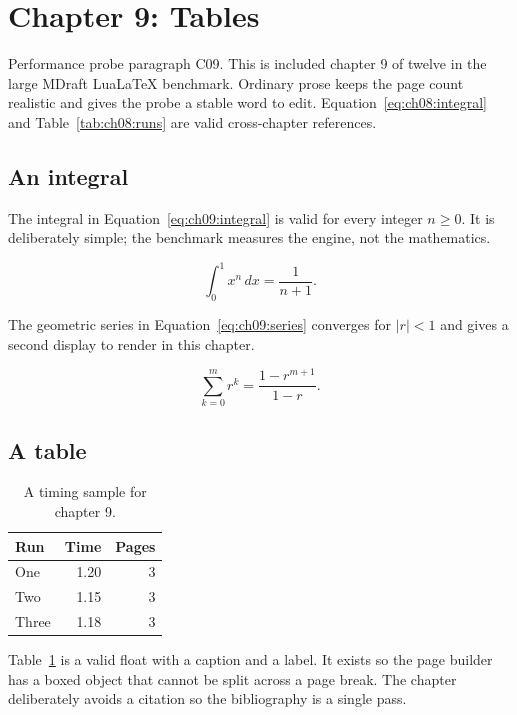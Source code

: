 \section{Chapter 9: Tables}
\label{sec:ch09}

Performance probe paragraph C09. This is included chapter 9 of twelve in
the large MDraft LuaLaTeX benchmark. Ordinary prose keeps the page count
realistic and gives the probe a stable word to edit. Equation~\ref{eq:ch08:integral} and
Table~\ref{tab:ch08:runs} are valid cross-chapter references.

\subsection{An integral}
The integral in Equation~\ref{eq:ch09:integral} is valid for every integer
$n \ge 0$. It is deliberately simple; the benchmark measures the engine, not
the mathematics.

\begin{equation}
  \label{eq:ch09:integral}
  \int_{0}^{1} x^{n}\,dx = \frac{1}{n+1}.
\end{equation}

The geometric series in Equation~\ref{eq:ch09:series} converges for
$|r| < 1$ and gives a second display to render in this chapter.

\begin{equation}
  \label{eq:ch09:series}
  \sum_{k=0}^{m} r^{k} = \frac{1-r^{m+1}}{1-r}.
\end{equation}

\subsection{A table}
\begin{table}[h]
  \centering
  \begin{tabular}{lrr}
    \toprule
    Run & Time & Pages \\
    \midrule
    One   & 1.20 & 3 \\
    Two   & 1.15 & 3 \\
    Three & 1.18 & 3 \\
    \bottomrule
  \end{tabular}
  \caption{A timing sample for chapter 9.}
  \label{tab:ch09:runs}
\end{table}

Table~\ref{tab:ch09:runs} is a valid float with a caption and a label. It
exists so the page builder has a boxed object that cannot be split across a
page break. The chapter deliberately avoids a citation so the bibliography is a single pass.

